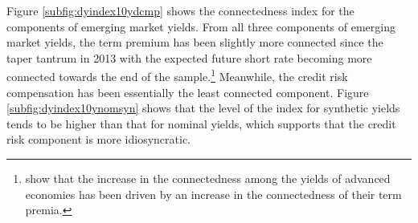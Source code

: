 
Figure \ref{subfig:dyindex10ydcmp} shows the connectedness index for the components of emerging market yields. %
From all three components of emerging market yields, the term premium has been slightly more connected since the taper tantrum in 2013 with the expected future short rate becoming more connected towards the end of the sample.\footnote{ \cite{ACDM:2019} show that the increase in the connectedness among the yields of advanced economies has been driven by an increase in the connectedness of their term premia.} 
Meanwhile, the credit risk compensation has been essentially the least connected component.
Figure \ref{subfig:dyindex10ynomsyn} shows that the level of the index for synthetic yields tends to be higher than that for nominal yields, which supports that the credit risk component is %
more idiosyncratic. %

